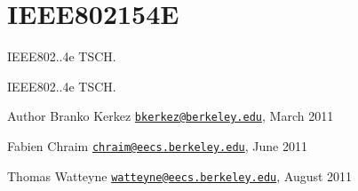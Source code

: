 \hypertarget{group___i_e_e_e802154_e}{}\section{I\+E\+E\+E802154E}
\label{group___i_e_e_e802154_e}


I\+E\+E\+E802..\+4e T\+S\+CH.  


I\+E\+E\+E802..\+4e T\+S\+CH. 

\begin{DoxyAuthor}{Author}
Branko Kerkez \href{mailto:bkerkez@berkeley.edu}{\tt bkerkez@berkeley.\+edu}, March 2011 

Fabien Chraim \href{mailto:chraim@eecs.berkeley.edu}{\tt chraim@eecs.\+berkeley.\+edu}, June 2011 

Thomas Watteyne \href{mailto:watteyne@eecs.berkeley.edu}{\tt watteyne@eecs.\+berkeley.\+edu}, August 2011 
\end{DoxyAuthor}

